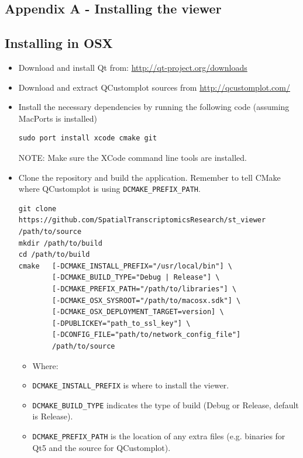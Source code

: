 \documentclass[10pt,a4paper,titlepage]{book}
\begin{document}
\begin{appendices}
\chapter*{Appendix A - Installing the viewer}\label{Appendix A}
\section*{Installing in OSX}

\begin{itemize}[itemsep=10pt]
\item Download and install Qt from: \url{http://qt-project.org/downloads}
\item Download and extract QCustomplot sources from \url{http://qcustomplot.com/}
\item Install the necessary dependencies by running the following code (assuming MacPorts is installed)
\begin{verbatim}
sudo port install xcode cmake git
\end{verbatim}
NOTE: Make sure the XCode command line tools are installed.
\item Clone the repository and build the application. Remember to tell CMake where QCustomplot is using \texttt{DCMAKE\_PREFIX\_PATH}.
\vspace{1pt}
\begin{verbatim}
git clone https://github.com/SpatialTranscriptomicsResearch/st_viewer /path/to/source
mkdir /path/to/build
cd /path/to/build
cmake   [-DCMAKE_INSTALL_PREFIX="/usr/local/bin"] \
        [-DCMAKE_BUILD_TYPE="Debug | Release"] \
        [-DCMAKE_PREFIX_PATH="/path/to/libraries"] \
        [-DCMAKE_OSX_SYSROOT="/path/to/macosx.sdk"] \
        [-DCMAKE_OSX_DEPLOYMENT_TARGET=version] \
        [-DPUBLICKEY="path_to_ssl_key"] \
        [-DCONFIG_FILE="path/to/network_config_file"]
        /path/to/source
\end{verbatim}
\vspace{10pt}
\begin{itemize}
\item[] Where:
\item[] \texttt{DCMAKE\_INSTALL\_PREFIX} is where to install the viewer.
\item[] \texttt{DCMAKE\_BUILD\_TYPE} indicates the type of build (Debug or Release, default is Release).
\item[] \texttt{DCMAKE\_PREFIX\_PATH} is the location of any extra files (e.g. binaries for Qt5 and the source for QCustomplot).

\end{itemize}
\end{itemize}
\end{appendices}
\end{document}
